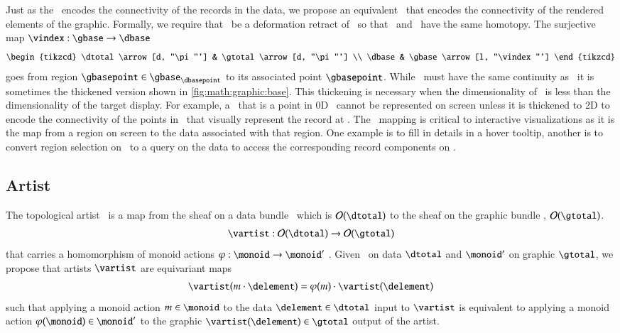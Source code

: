 \documentclass[journal]{vgtc}                %
\begin{document}
Just as the \dbase\ encodes the connectivity of the records in the data, we propose an equivalent \gbase\ that encodes the connectivity of the rendered elements of the graphic. Formally, we require that \dbase\ be a deformation retract\cite{RetractionTopology2020} of \gbase\ so that \dbase\ and \gbase\ have the same homotopy. The surjective map $\vindex: \gbase \rightarrow \dbase$ 
\begin{equation}
    \begin{tikzcd}
        \dtotal \arrow[d, "\pi"'] & \gtotal \arrow[d, "\pi"'] \\
        \dbase                   & \gbase \arrow[l, "\vindex"']
    \end{tikzcd}
\end{equation}
goes from region $\gbasepoint \in \gbase_{\dbasepoint}$ to its associated point $\gbasepoint$. While \gbase\ must have the same continuity as \dbase\, it is sometimes the  thickened version shown in \autoref{fig:math:graphic:base}. This thickening is necessary when the dimensionality of \dbase\ is less than the dimensionality of the target display. For example, a \dbasepoint\ that is a point in 0D \dbase\ cannot be represented on screen unless it is thickened to 2D to encode the connectivity of the points in \gfiber\ that visually represent the record at \dbasepoint. The \vindex\ mapping is critical to interactive visualizations as it is the map from a region on screen to the data associated with that region. One example is to fill in details in a hover tooltip, another is to convert region selection on \gbase\ to a query on the data to access the corresponding record components on \dbase.

\subsection{Artist}
\label{sec:math:artist}
The topological artist \vartist\ is a map from the sheaf on a data bundle \dtotal\ which is $\mathcal{O}(\dtotal)$ to the sheaf on the graphic bundle \gtotal, $\mathcal{O}(\gtotal)$. 
\begin{equation}
    \vartist: \mathcal{O}(\dtotal) \rightarrow \mathcal{O}(\gtotal)
    \label{eq:math:artist:artist}
\end{equation}
that carries a homomorphism of monoid actions $\varphi: \monoid \rightarrow \monoid^{\prime}$ \cite{cegarraCohomologyMonoidsOperators2019}. Given \monoid\ on data $\mathscr{\dtotal}$ and $\monoid^{\prime}$ on graphic $\mathscr{\gtotal}$, we propose that artists $\mathscr{\vartist}$ are equivariant maps 
\begin{equation}
\vartist(m\cdot \delement) = \varphi(m)\cdot \vartist(\delement) 
\end{equation}
such that applying a monoid action $m \in \monoid$ to the data $\delement \in \mathscr{\dtotal}$ input to $\mathscr{\vartist}$ is equivalent to applying a monoid action $\varphi(\monoid) \in \monoid^{\prime}$ to the graphic $\vartist(\delement) \in \mathscr{\gtotal}$ output of the artist.
\end{document}
